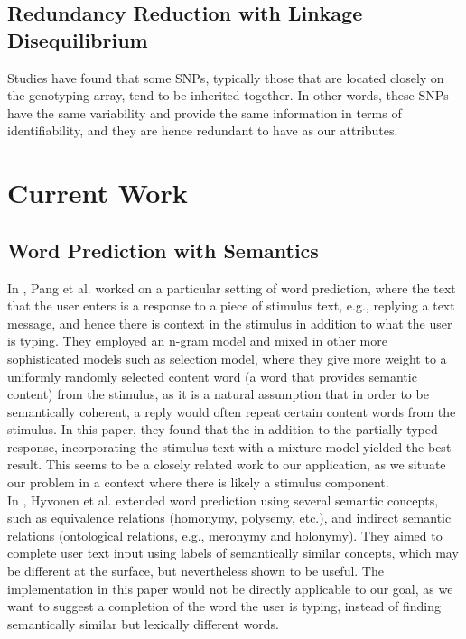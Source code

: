 \documentclass[14pt, oneside]{article}   	%
\begin{document}
\subsection{Redundancy Reduction with Linkage Disequilibrium}
Studies have found that some SNPs, typically those that are located closely on the genotyping array, tend to be inherited together.
In other words, these SNPs have the same variability and provide the same information in terms of identifiability,
and they are hence redundant to have as our attributes.
\\
%
%
%
%
%
%
%
%
%
\section{Current Work}
\subsection{Word Prediction with Semantics}
In \cite{pang2012revisiting},
Pang et al. worked on a particular setting of word prediction,
where the text that the user enters is a response to a piece of stimulus text, e.g., replying a text message,
and hence there is context in the stimulus in addition to what the user is typing.
They employed an n-gram model and mixed in other more sophisticated models such as
selection model, where they give more weight to a uniformly randomly selected content word
(a word that provides semantic content)
from the stimulus, as it is a natural assumption that in order to be semantically coherent,
a reply would often repeat certain content words from the stimulus.
In this paper, they found that the in addition to the partially typed response,
incorporating the stimulus text with a mixture model yielded the best result.
This seems to be a closely related work to our application,
as we situate our problem in a context where there is likely a stimulus component.\\

In \cite{hyvonen2006semantic},
Hyvonen et al. extended word prediction using several semantic concepts,
such as equivalence relations (homonymy, polysemy, etc.),
and indirect semantic relations (ontological relations, e.g., meronymy and holonymy).
They aimed to complete user text input using labels of semantically similar concepts,
which may be different at the surface, but nevertheless shown to be useful.
The implementation in this paper would not be directly applicable to our goal,
as we want to suggest a completion of the word the user is typing,
instead of finding semantically similar but lexically different words.\\
\end{document}

